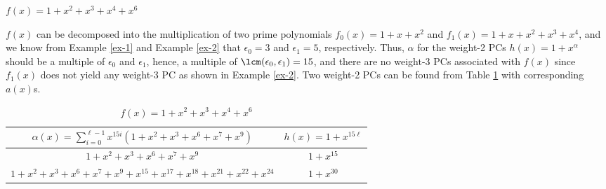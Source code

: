 \begin{example}
$f(x)=1+x^2+x^3+x^4+x^6$

$f(x)$ can be decomposed into the multiplication of two prime polynomials $f_0(x)=1+x+x^2$ and $f_1(x)=1+x+x^2+x^3+x^4$, and we know from Example \ref{ex-1} and Example \ref{ex-2} that $\epsilon_0=3$ and $\epsilon_1=5$, respectively. Thus, $\alpha$ for the weight-2 PCs $h(x) = 1+x^\alpha$ should be a multiple of $\epsilon_0$ and $\epsilon_1$, hence, a multiple of $\lcm(\epsilon_0,\epsilon_1)=15$, and there are no weight-3 PCs associated with $f(x)$ since $f_1(x)$ does not yield any weight-3 PC as shown in Example \ref{ex-2}. Two weight-2 PCs can be found from Table \ref{novelTab1-c} with corresponding $a(x)$s.

\begin{table}[htbp]
\renewcommand{\arraystretch}{1.3}
 \caption{$f(x)=1+x^2+x^3+x^4+x^6$}
 \centering
\begin{tabular}{c c } 
\toprule
 $\alpha(x)=\sum_{i=0}^{\ell-1} x^{15i}(1+x^2+x^3+x^6+x^7+x^9)$ & $h(x)=1+x^{15\ell}$ \\ [0.5ex] 
\midrule
$1+x^2+x^3+x^6+x^7+x^9$ & $1+x^{15}$\\ 
\hline
$1+x^2+x^3+x^6+x^7+x^9+x^{15}+x^{17}+x^{18}+x^{21}+x^{22}+x^{24}$ & $1+x^{30}$ \\
\bottomrule
\end{tabular}
 \label{novelTab1-c}
\end{table}

\label{ex-4}
\end{example}

